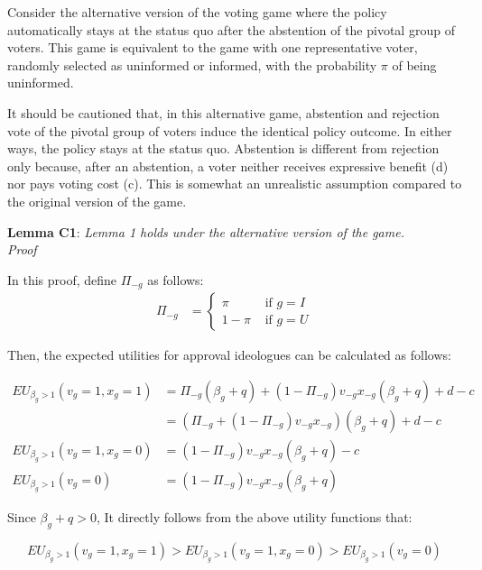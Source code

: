 \par Consider the alternative version of the voting game where the policy automatically stays at the status quo after the abstention of the pivotal group of voters. This game is equivalent to the game with one representative voter, randomly selected as uninformed or informed, with the probability $\pi$ of being uninformed. 

\par It should be cautioned that, in this alternative game, abstention and rejection vote of the pivotal group of voters induce the identical policy outcome. In either ways, the policy stays at the status quo. Abstention is different from rejection only because, after an abstention, a voter neither receives expressive benefit (d) nor pays voting cost (c). This is somewhat an unrealistic assumption compared to the original version of the game.

\noindent \textbf{Lemma C1}: \textit{Lemma 1 holds under the alternative version of the game.}\\ 

\noindent \textit{Proof}

\par In this proof, define $\Pi_{-g}$ as follows:
\begin{align*}
	\Pi_{-g} &= \begin{cases}
		\pi &\text{ if } g = I \\
		1-\pi &\text{ if } g = U
		\end{cases}
\end{align*} 

\noindent Then, the expected utilities for approval ideologues can be calculated as follows:

\begin{align*}
	EU_{\beta_g>1} (v_g=1, x_g=1) &= \Pi_{-g} (\beta_g + q) + (1-\Pi_{-g}) v_{-g} x_{-g} (\beta_g+q) + d - c \\
	&= (\Pi_{-g} + (1-\Pi_{-g})v_{-g} x_{-g}) (\beta_g+q) + d - c \\
	EU_{\beta_g>1} (v_g=1, x_g=0) &= (1-\Pi_{-g}) v_{-g} x_{-g} (\beta_g+q) - c \\
	EU_{\beta_g>1}(v_g=0) &= (1-\Pi_{-g})v_{-g} x_{-g} (\beta_g+q)
\end{align*}

\noindent Since $\beta_g+q>0$, It directly follows from the above utility functions that:

$$EU_{\beta_g>1} (v_g=1, x_g=1) > EU_{\beta_g>1} (v_g=1, x_g=0) > EU_{\beta_g>1}(v_g=0)$$

